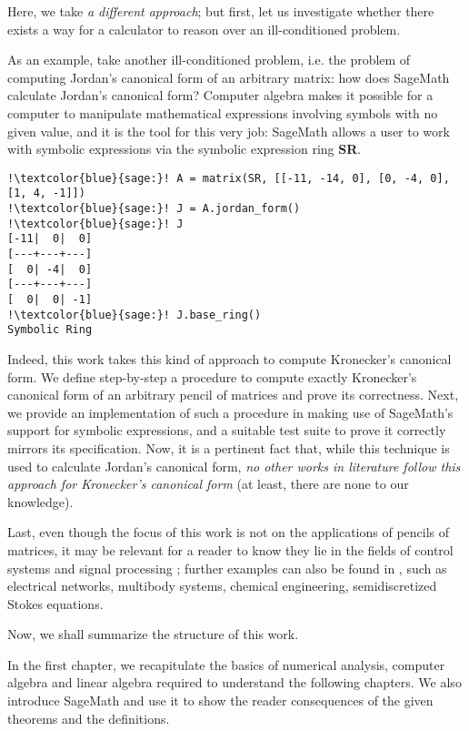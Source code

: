 Here, we take \textit{a different approach}; but first, let us investigate whether there exists a way for a
calculator to reason over an ill-conditioned problem.

As an example, take another ill-conditioned problem, i.e. the problem of computing Jordan's canonical form of
an arbitrary matrix: how does SageMath calculate Jordan's canonical form? Computer algebra makes it possible for
a computer to manipulate mathematical expressions involving symbols with no given value, and it is the tool for
this very job: SageMath allows a user to work with symbolic expressions via the symbolic expression ring \textbf{SR}.
\begin{verbatim}
!\textcolor{blue}{sage:}! A = matrix(SR, [[-11, -14, 0], [0, -4, 0], [1, 4, -1]])
!\textcolor{blue}{sage:}! J = A.jordan_form()
!\textcolor{blue}{sage:}! J
[-11|  0|  0]
[---+---+---]
[  0| -4|  0]
[---+---+---]
[  0|  0| -1]
!\textcolor{blue}{sage:}! J.base_ring()
Symbolic Ring
\end{verbatim}

Indeed, this work takes this kind of approach to compute Kronecker's canonical form. We define step-by-step a
procedure to compute exactly Kronecker's canonical form of an arbitrary pencil of matrices and prove its
correctness. Next, we provide an implementation of such a procedure in \cite{trapani-kronecker} making use of
SageMath's support for symbolic expressions, and a suitable test suite to prove it correctly mirrors its
specification. Now, it is a pertinent fact that, while this technique is used to calculate Jordan's canonical
form, \textit{no other works in literature follow this approach for Kronecker's canonical form} (at least, there
are none to our knowledge).

Last, even though the focus of this work is not on the applications of pencils of matrices, it may be relevant
for a reader to know they lie in the fields of control
systems \cite{824690, 1103983} and signal processing \cite{1179782}; further examples can also be found in
\cite[pp. 8-11]{kunkel-mehrmann}, such as electrical networks, multibody systems, chemical
engineering, semidiscretized Stokes equations.

\vspace{5mm}

Now, we shall summarize the structure of this work.

In the first chapter, we recapitulate the basics of numerical analysis, computer algebra and linear algebra required to
understand the following chapters. We also introduce SageMath and use it to show the reader consequences of the given
theorems and the definitions.

